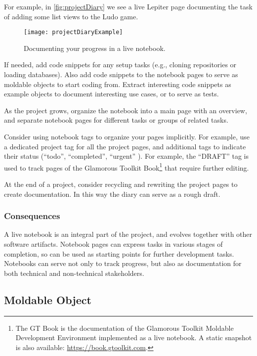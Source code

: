 \documentclass[sigconf]{acmart}
\begin{document}
For example, in \autoref{fig:projectDiary} we see a live Lepiter page \cite{Girb21a} documenting the task of adding some list views to the Ludo game.

\begin{figure}[h]
  \texttt{[image: projectDiaryExample]}
  \caption{Documenting your progress in a live notebook.}
  \label{fig:projectDiary}
\end{figure}

If needed, add code snippets for any setup tasks (e.g., cloning repositories or loading databases).
Also add code snippets to the notebook pages to serve as moldable objects to start coding from.
Extract interesting code snippets as example objects to document interesting use cases, or to serve as tests.

As the project grows, organize the notebook into a main page with an overview, and separate notebook pages for different tasks or groups of related tasks.

Consider using notebook tags to organize your pages implicitly. For example, use a dedicated project tag for all the project pages, and additional tags to indicate their status (``todo'', ``completed'', ``urgent'' \etc).
For example, the ``DRAFT'' tag is used to track pages of the Glamorous Toolkit Book\footnote{The GT Book is the documentation of the Glamorous Toolkit Moldable Development Environment implemented as a live notebook. A static snapshot is also available: \url{https://book.gtoolkit.com}.} that require further editing.

At the end of a project, consider recycling and rewriting the project pages to create documentation. In this way the diary can serve as a rough draft.

\subsubsection*{Consequences}

A live notebook is an integral part of the project, and evolves together with other software artifacts.
Notebook pages can express tasks in various stages of completion, so can be used as starting points for further development tasks.
Notebooks can serve not only to track progress, but also as documentation for both technical and non-technical stakeholders.

\subsection*{Moldable Object}\label{pat:moldableObject}
\end{document}
